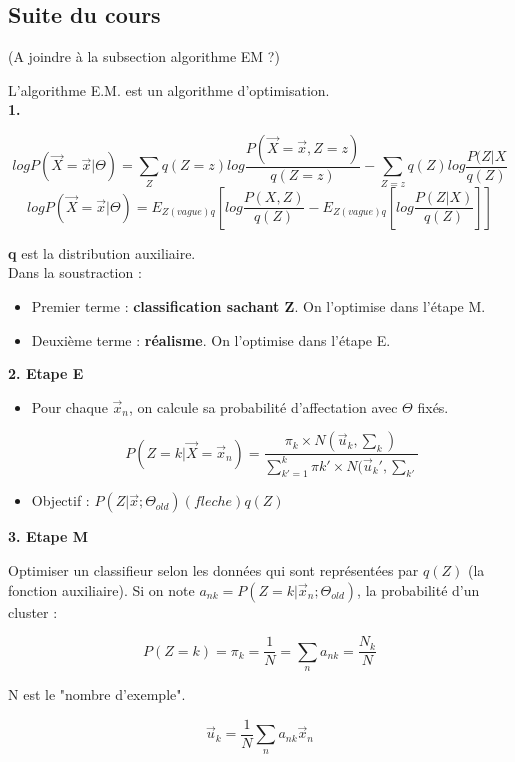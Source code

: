 \documentclass{article}
\begin{document}
\subsection{Suite du cours}

(A joindre à la subsection algorithme EM ?)

L'algorithme E.M. est un algorithme d'optimisation. \\

\textbf{1.}

\[ log P(\vec{X} = \vec{x} | \Theta) = \sum_Z q(Z = z) log \frac{P(\vec{X} = \vec{x}, Z = z)}{q(Z = z)} - \sum_{Z = z} q(Z) log \frac{P(Z | X}{q(Z)} \]
\[ log P(\vec{X} = \vec{x} | \Theta) = E_{Z (vague) q} [ log \frac{P(X, Z)}{q(Z)} - E_{Z (vague) q} [log \frac{P(Z | X)}{q(Z)}]  ] \]

\textbf{q} est la distribution auxiliaire. \\
Dans la soustraction : 
\begin{itemize}
\item Premier terme : \textbf{classification sachant Z}. On l'optimise dans l'étape M.
\item Deuxième terme : \textbf{réalisme}. On l'optimise dans l'étape E.
\end{itemize}

\textbf{2. Etape E}

\begin{itemize}

\item Pour chaque $\vec{x}_n$, on calcule sa probabilité d'affectation avec $\Theta$ fixés.

\[ P(Z = k | \vec{X} = \vec{x}_n) = \frac{\pi_k \times N(\vec{u}_k, \sum_k)}{\sum_{k' = 1}^{k} \pi k' \times N(\vec{u}_k', \sum_{k'}  } \]

\item Objectif : $P(Z | \vec{x}; \Theta_{old}) (fleche) q(Z)$

\end{itemize}

\textbf{3. Etape M}

Optimiser un classifieur selon les données qui sont représentées par $q(Z)$ (la fonction auxiliaire). Si on note $a_{nk} = P(Z = k | \vec{x}_n; \Theta_{old})$,
la probabilité d'un cluster :

\[ P(Z = k) = \pi_k = \frac{1}{N} = \sum_n a_{nk} = \frac{N_k}{N} \] 

N est le "nombre d'exemple".

\[ \vec{u}_k = \frac{1}{N} \sum_n a_{nk} \vec{x}_n \]
\end{document}
